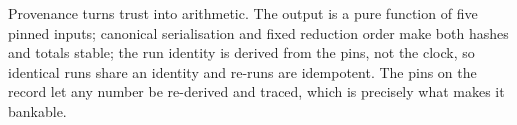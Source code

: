 \begin{keyidea}
Provenance turns trust into arithmetic. The output is a pure function of five pinned inputs; canonical serialisation and fixed reduction order make both hashes and totals stable; the run identity is derived from the pins, not the clock, so identical runs share an identity and re-runs are idempotent. The pins on the record let any number be re-derived and traced, which is precisely what makes it bankable.
\end{keyidea}
